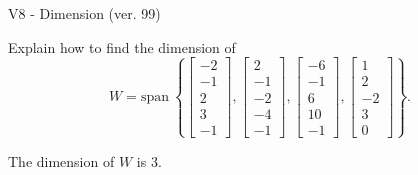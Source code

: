 \begin{exercise}
  \begin{exerciseTitle}V8 - Dimension (ver. 99)\end{exerciseTitle}
  \begin{exerciseStatement}
    Explain how to find the dimension of 
\[W=\mathrm{span}\ \left\{\left[\begin{array}{r}
-2 \\
-1 \\
2 \\
3 \\
-1
\end{array}\right] , \left[\begin{array}{r}
2 \\
-1 \\
-2 \\
-4 \\
-1
\end{array}\right] , \left[\begin{array}{r}
-6 \\
-1 \\
6 \\
10 \\
-1
\end{array}\right] , \left[\begin{array}{r}
1 \\
2 \\
-2 \\
3 \\
0
\end{array}\right]\right\}.\]



  \end{exerciseStatement}
  \begin{exerciseAnswer}
   The dimension of \(W\) is  \(3\).
  


  \end{exerciseAnswer}
\end{exercise}